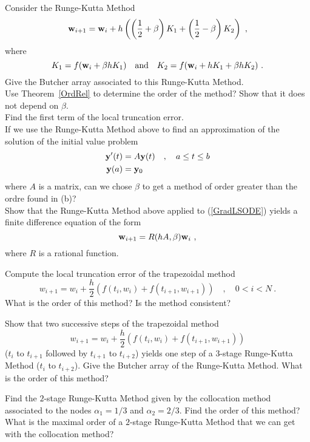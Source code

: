 \begin{question}
Consider the Runge-Kutta Method
\[
\mathbf{w}_{i+1} = \mathbf{w}_i + h\left( \left(\frac{1}{2}+\beta\right)K_1
+ \left(\frac{1}{2}-\beta\right)K_2\right) \ ,
\]
where
\[
K_1 = f(\mathbf{w}_i + \beta h K_1) \quad \text{and} \quad
K_2 = f(\mathbf{w}_i + h K_1 + \beta h K_2) \ .
\]
 Give the Butcher array associated to this Runge-Kutta
Method.\\
 Use Theorem~\ref{OrdRel} to determine the order of the
method?  Show that it does not depend on $\beta$.\\
 Find the first term of the local truncation error.\\
 If we use the Runge-Kutta Method above to find an
approximation of the solution of the initial value problem
\begin{equation}\label{GradLSODE}
\begin{split}
\mathbf{y}'(t) &= A \mathbf{y}(t) \quad , \quad a \leq t \leq b\\
\mathbf{y}(a) &= \mathbf{y}_0
\end{split}
\end{equation}
where $A$ is a \nn matrix, can we chose $\beta$ to get a method of
order greater than the ordre found in (b)? \\
 Show that the Runge-Kutta Method above applied to
(\ref{GradLSODE}) yields a finite difference equation of the form
\[
\VEC{w}_{i+1} = R(h A,\beta) \VEC{w}_i \ ,
\]
where $R$ is a rational function.
\label{initQ6}
\end{question}

\begin{question}
Compute the local truncation error of the trapezoidal method
\[
w_{i+1} = w_i + \frac{h}{2}\left( f(t_i,w_i) + f(t_{i+1},w_{i+1}) \right)
\quad , \quad 0 < i < N \ .
\]
What is the order of this method?  Is the method consistent?
\label{initQ7}
\end{question}

\begin{question}
Show that two successive steps of the trapezoidal method
\[
w_{i+1} = w_i + \frac{h}{2}\left( f(t_i,w_i) + f(t_{i+1},w_{i+1}) \right)
\]
($t_i$ to $t_{i+1}$ followed by $t_{i+1}$ to $t_{i+2}$) yields one
step of a $3$-stage Runge-Kutta Method ($t_i$ to $t_{i+2}$).  Give the
Butcher array of the Runge-Kutta Method.  What is the order of this
method?
\label{initQ8}
\end{question}

\begin{question}
Find the $2$-stage Runge-Kutta Method given by the collocation method
associated to the nodes $\alpha_1 = 1/3$ and $\alpha_2 = 2/3$.  Find the order
of this method?  What is the maximal order of a $2$-stage Runge-Kutta
Method that we can get with the collocation method?
\label{initQ9}
\end{question}

